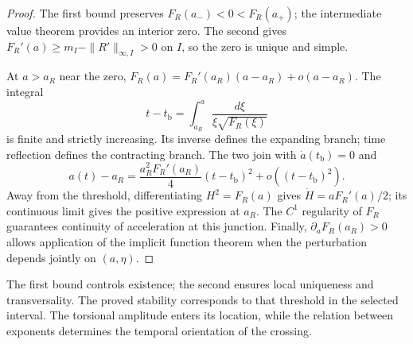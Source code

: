 \begin{proof}
The first bound preserves
\(F_R(a_-)<0<F_R(a_+)\); the intermediate value theorem provides
an interior zero. The second gives
\(F_R'(a)\geq m_I-\|R'\|_{\infty,I}>0\) on \(I\), so the zero
is unique and simple.

At \(a>a_R\) near the zero,
\(F_R(a)=F_R'(a_R)(a-a_R)+o(a-a_R)\).
The integral
\[
 t-t_{\mathrm b}=\int_{a_R}^{a}
          \frac{d\xi}{\xi\sqrt{F_R(\xi)}}
\]
is finite and strictly increasing. Its inverse defines the expanding
branch; time reflection defines the contracting branch.
The two join with \(\dot a(t_{\mathrm b})=0\) and
\[
 a(t)-a_R
 =\frac{a_R^2F_R'(a_R)}4(t-t_{\mathrm b})^2
   +o((t-t_{\mathrm b})^2).
\]
Away from the threshold, differentiating \(H^2=F_R(a)\) gives
\(\dot H=aF_R'(a)/2\); its continuous limit gives the positive expression
at \(a_R\). The \(C^1\) regularity of \(F_R\) guarantees continuity
of acceleration at this junction. Finally,
\(\partial_aF_R(a_R)>0\) allows application of the implicit function
theorem when the perturbation depends jointly on \((a,\eta)\).
\end{proof}

The first bound controls existence; the second ensures local
uniqueness and transversality. The proved stability corresponds to
that threshold in the selected interval. The torsional amplitude
enters its location, while the relation between
exponents determines the temporal orientation of the crossing.
